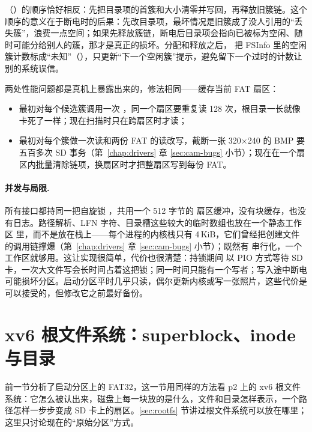 （）的顺序恰好相反：先把目录项的首簇和大小清零并写回，再释放旧簇链。这个顺序的意义在于断电时的后果：先改目录项，最坏情况是旧簇成了没人引用的“丢失簇”，浪费一点空间；如果先释放簇链，断电后目录项会指向已被标为空闲、随时可能分给别人的簇，那才是真正的损坏。分配和释放之后， 把 FSInfo 里的空闲簇计数标成“未知”（），只更新“下一个空闲簇”提示，避免留下一个过时的计数让别的系统误信。

两处性能问题都是真机上暴露出来的，修法相同——缓存当前 FAT 扇区：
\begin{itemize}
  \item {} 最初对每个候选簇调用一次 ，同一个扇区要重复读 128 次，根目录一长就像卡死了一样；现在扫描时只在跨扇区时才读；
  \item {} 最初对每个簇做一次读和两份 FAT 的读改写，截断一张 320$\times$240 的 BMP 要五百多次 SD 事务（第~\ref{chap:drivers} 章 \ref{sec:cam-bugs} 小节）；现在在一个扇区内批量清除链项，换扇区时才把整扇区写到每份 FAT。
\end{itemize}

\paragraph{并发与局限.} 所有接口都持同一把自旋锁 ，共用一个 512 字节的  扇区缓冲，没有块缓存，也没有日志。路径解析、LFN 字符、目录槽这些较大的临时数组也放在一个静态工作区  里，而不是放在栈上——每个进程的内核栈只有 4\,KiB，它们曾经把创建文件的调用链撑爆（第~\ref{chap:drivers} 章 \ref{sec:cam-bugs} 小节）；既然有  串行化，一个工作区就够用。这让实现很简单，代价也很清楚：持锁期间  以 PIO 方式等待 SD 卡，一次大文件写会长时间占着这把锁；同一时间只能有一个写者；写入途中断电可能损坏分区。启动分区平时几乎只读，偶尔更新内核或写一张照片，这些代价是可以接受的，但修改它之前最好备份。

\section{xv6 根文件系统：superblock、inode 与目录}
\label{sec:xv6fs}

前一节分析了启动分区上的 FAT32，这一节用同样的方法看 p2 上的 xv6 根文件系统：它怎么被认出来，磁盘上每一块放的是什么，文件和目录怎样表示，一个路径怎样一步步变成 SD 卡上的扇区。\ref{sec:rootfs} 节讲过根文件系统可以放在哪里；这里只讨论现在的“原始分区”方式。

